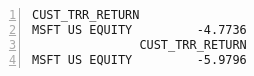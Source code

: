 \documentclass[a4paper]{article}
\begin{document}
    

\begin{Verbatim}[commandchars=@\[\],numbers=left,firstnumber=1,stepnumber=1]
               CUST_TRR_RETURN
MSFT US EQUITY         -4.7736
               CUST_TRR_RETURN
MSFT US EQUITY         -5.9796
\end{Verbatim}

    



\end{document}
